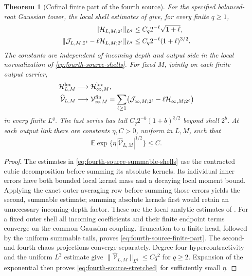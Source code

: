 \documentclass[11pt,oneside,openany]{book}
\newtheorem{theorem}{Theorem}[chapter]
\theoremstyle{definition}
\theoremstyle{remark}
\newcommand{\E}{\mathbb E}
\newcommand{\src}[2]{\cite[#2]{#1}}
\begin{document}
\begin{theorem}[Cofinal finite part of the fourth source]
\label{thm:fourth-source-finite-part}
For the specified balanced-root Gaussian tower, the local shell estimates
of \src{F14}{V31--V32} give, for every finite $q\ge1$,
\begin{align}
 \|\mathcal H_{L,M;2^\ell}\|_{L^q}
      &\le C_q2^{-\ell}\sqrt{1+\ell},\notag\\
 \|\mathcal J_{L,M;2^\ell}
                       -\ell\mathcal H_{L,M;2^\ell}\|_{L^q}
      &\le C_q2^{-\ell}(1+\ell)^{3/2}.
 \label{eq:fourth-source-summable-shells}
\end{align}
The constants are independent of incoming depth and output side in the
local normalization of \cref{eq:fourth-source-shells}. For fixed $M$,
jointly on each finite output carrier,
\begin{align}
 \mathcal H^{\rm loc}_{L,M}&\longrightarrow
                            \mathcal H^{\rm loc}_{\infty,M},\notag\\
 \widehat{\mathcal V}_{L,M}&\longrightarrow
 \mathcal V^{\rm fin}_{\infty,M}
   =\sum_{\ell\ge1}
      \bigl(\mathcal J_{\infty,M;2^\ell}
                  -\ell\mathcal H_{\infty,M;2^\ell}\bigr)
 \label{eq:fourth-source-finite-part}
\end{align}
in every finite $L^q$. The last series has tail
$C_q2^{-b}(1+b)^{3/2}$ beyond shell $2^b$. At each output link there
are constants $\eta,C>0$, uniform in $L,M$, such that
\begin{equation}
 \E\exp\{\eta|\widehat{\mathcal V}_{L,M}|^{1/2}\}\le C.
 \label{eq:fourth-source-stretched}
\end{equation}
\end{theorem}
\begin{proof}
The estimates in \cref{eq:fourth-source-summable-shells} use the
contracted cubic decomposition before summing its absolute kernels.
Its individual inner errors have both bounded local kernel mass and a
decaying local moment bound. Applying the exact outer averaging row
before summing those errors yields the second, summable estimate;
summing absolute kernels first would retain an unnecessary incoming-depth
factor. These are the local analytic estimates of \src{F14}{V32}.
For a fixed outer shell all incoming coefficients and their finite endpoint
terms converge on the common Gaussian coupling. Truncation to a finite
head, followed by the uniform summable tails, proves
\cref{eq:fourth-source-finite-part}. The second- and fourth-chaos
projections converge separately. Degree-four hypercontractivity and the
uniform $L^2$ estimate give
$\|\widehat{\mathcal V}_{L,M}\|_{L^q}\le Cq^2$ for $q\ge2$.
Expansion of the exponential then proves
\cref{eq:fourth-source-stretched} for sufficiently small $\eta$.
\end{proof}
\end{document}
